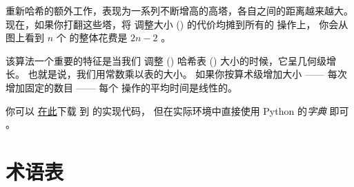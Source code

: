 
重新哈希的额外工作，表现为一系列不断增高的高塔，各自之间的距离越来越大。
现在，如果你打翻这些塔，将 调整大小 () 的代价均摊到所有的 操作上， 你会从图上看到 $n$ 个  的整体花费是 $2n - 2$ 。


该算法一个重要的特征是当我们 调整 () 哈希表 ()
大小的时候，它呈几何级增长。  也就是说，我们用常数乘以表的大小。
如果你按算术级增加大小 —— 每次增加固定的数目 —— 每个  操作的平均时间是线性的。


你可以 \href{http://thinkpython2.com/code/Map.py}{在此}下载 到  的实现代码， 但在实际环境中直接使用 Python 的{\em 字典} 即可 。

\section{术语表}

